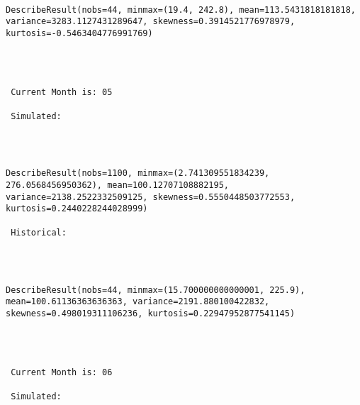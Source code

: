 \documentclass[11pt]{article}
\begin{document}
    \begin{center}
    \end{center}
    { \hspace*{\fill} \\}
    
    \begin{Verbatim}[commandchars=\\\{\}]
DescribeResult(nobs=44, minmax=(19.4, 242.8), mean=113.5431818181818, variance=3283.1127431289647, skewness=0.3914521776978979, kurtosis=-0.5463404776991769) 



 
 Current Month is: 05

 Simulated: 
 

    \end{Verbatim}

    \begin{center}
    \end{center}
    { \hspace*{\fill} \\}
    
    \begin{Verbatim}[commandchars=\\\{\}]
DescribeResult(nobs=1100, minmax=(2.741309551834239, 276.0568456950362), mean=100.12707108882195, variance=2138.2522332509125, skewness=0.5550448503772553, kurtosis=0.2440228244028999)

 Historical: 
 

    \end{Verbatim}

    \begin{center}
    \end{center}
    { \hspace*{\fill} \\}
    
    \begin{Verbatim}[commandchars=\\\{\}]
DescribeResult(nobs=44, minmax=(15.700000000000001, 225.9), mean=100.61136363636363, variance=2191.880100422832, skewness=0.498019311106236, kurtosis=0.22947952877541145) 



 
 Current Month is: 06

 Simulated: 
 

    \end{Verbatim}
\end{document}
